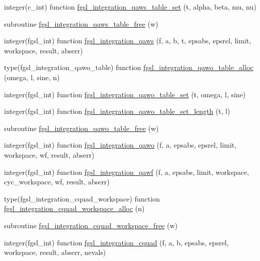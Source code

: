 \begin{DoxyCompactItemize}
\item 
integer(c\+\_\+int) function \hyperlink{integration_8finc_a3ebff9b31d58dc16c86dcbb4e78ca147}{fgsl\+\_\+integration\+\_\+qaws\+\_\+table\+\_\+set} (t, alpha, beta, mu, nu)
\item 
subroutine \hyperlink{integration_8finc_afbdbd695fee99b46d0c7eecfd8d47090}{fgsl\+\_\+integration\+\_\+qaws\+\_\+table\+\_\+free} (w)
\item 
integer(fgsl\+\_\+int) function \hyperlink{integration_8finc_acfd1871c7ba87e757856816892c109d6}{fgsl\+\_\+integration\+\_\+qaws} (f, a, b, t, epsabs, epsrel, limit, workspace, result, abserr)
\item 
type(fgsl\+\_\+integration\+\_\+qawo\+\_\+table) function \hyperlink{integration_8finc_ae0570ee20a37dcf429578cdaf6ee23f9}{fgsl\+\_\+integration\+\_\+qawo\+\_\+table\+\_\+alloc} (omega, l, sine, n)
\item 
integer(fgsl\+\_\+int) function \hyperlink{integration_8finc_af7958cb95b86e6240d437d1f95d39bf1}{fgsl\+\_\+integration\+\_\+qawo\+\_\+table\+\_\+set} (t, omega, l, sine)
\item 
integer(fgsl\+\_\+int) function \hyperlink{integration_8finc_ae1ff71ea188bac440272f58cf122ede8}{fgsl\+\_\+integration\+\_\+qawo\+\_\+table\+\_\+set\+\_\+length} (t, l)
\item 
subroutine \hyperlink{integration_8finc_a6ab4eb9bc12269b4318fbf1f51310816}{fgsl\+\_\+integration\+\_\+qawo\+\_\+table\+\_\+free} (w)
\item 
integer(fgsl\+\_\+int) function \hyperlink{integration_8finc_a63f7e2b34135b050947ffdb90bdfd0d0}{fgsl\+\_\+integration\+\_\+qawo} (f, a, epsabs, epsrel, limit, workspace, wf, result, abserr)
\item 
integer(fgsl\+\_\+int) function \hyperlink{integration_8finc_a168d9d1ad61f4965849dee091ec0e105}{fgsl\+\_\+integration\+\_\+qawf} (f, a, epsabs, limit, workspace, cyc\+\_\+workspace, wf, result, abserr)
\item 
type(fgsl\+\_\+integration\+\_\+cquad\+\_\+workspace) function \hyperlink{integration_8finc_ab01960acc26965be1f87862eaa41e200}{fgsl\+\_\+integration\+\_\+cquad\+\_\+workspace\+\_\+alloc} (n)
\item 
subroutine \hyperlink{integration_8finc_a96d0eb5c74542389355dd8c1fe35d5bd}{fgsl\+\_\+integration\+\_\+cquad\+\_\+workspace\+\_\+free} (w)
\item 
integer(fgsl\+\_\+int) function \hyperlink{integration_8finc_a1ffbbe565fc03775fe50c3c2d9150c05}{fgsl\+\_\+integration\+\_\+cquad} (f, a, b, epsabs, epsrel, workspace, result, abserr, nevals)

\end{DoxyCompactItemize}
